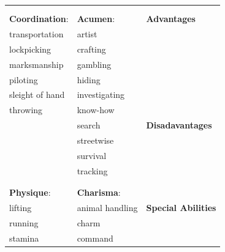\begin{table}
\begin{tabular}{m{156pt} m{156pt} m{156pt}}
\hrulefill                        & \hrulefill                      &                             \\
                                  &                                 &                             \\
\textbf{Coordination}: \hrulefill & \textbf{Acumen}: \hrulefill     & \textbf{Advantages}         \\
transportation \hrulefill         & artist \hrulefill               & \hrulefill                  \\
lockpicking \hrulefill            & crafting \hrulefill             & \hrulefill                  \\
marksmanship \hrulefill           & gambling \hrulefill             & \hrulefill                  \\
piloting \hrulefill               & hiding \hrulefill               & \hrulefill                  \\
sleight of hand \hrulefill        & investigating \hrulefill        & \hrulefill                  \\
throwing \hrulefill               & know-how \hrulefill             &                             \\
\hrulefill                        & search \hrulefill               & \textbf{Disadavantages}     \\
\hrulefill                        & streetwise \hrulefill           & \hrulefill                  \\
\hrulefill                        & survival \hrulefill             & \hrulefill                  \\
\hrulefill                        & tracking \hrulefill             & \hrulefill                  \\
\hrulefill                        & \hrulefill                      & \hrulefill                  \\
                                  &                                 & \hrulefill                  \\
\textbf{Physique}: \hrulefill     & \textbf{Charisma}: \hrulefill   &                             \\
lifting \hrulefill                & animal handling \hrulefill      & \textbf{Special Abilities}  \\
running \hrulefill                & charm \hrulefill                & \hrulefill                  \\
stamina \hrulefill                & command \hrulefill              & \hrulefill                  \\

\end{tabular}
\end{table}
